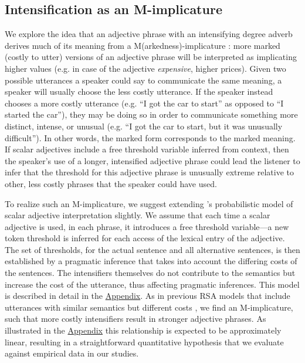 \documentclass[10pt,letterpaper]{article}
\newcommand{\w}[1]{\emph{#1}}
\begin{document}
\subsection{Intensification as an M-implicature}

We explore the idea that an adjective phrase with an intensifying degree adverb derives much of its meaning from a M(arkedness)-implicature \cite{levinson_presumptive_2000}: more marked (costly to utter) versions of an adjective phrase will be interpreted as implicating higher values (e.g. in case of the adjective \w{expensive}, higher prices). 
Given two possible utterances a speaker could say to communicate the same meaning, a speaker will usually choose the less costly utterance.
If the speaker instead chooses a more costly utterance (e.g. ``I got the car to start'' as opposed to ``I started the car''), they may be doing so in order to communicate something more distinct, intense, or unusual (e.g. ``I got the car to start, but it was unusually difficult'').
In other words, the marked form corresponds to the marked meaning.
If scalar adjectives include a free threshold variable inferred from context, then the speaker's use of a longer, intensified adjective phrase could lead the listener to infer that the threshold for this adjective phrase is unusually extreme relative to other, less costly phrases that the speaker could have used. 

To realize such an M-implicature, we suggest extending 's probabilistic model of scalar adjective interpretation slightly.
We assume that each time a scalar adjective is used, in each phrase, it introduces a free threshold variable---a new token threshold is inferred for each access of the lexical entry of the adjective.
The set of thresholds, for the actual sentence and all alternative sentences, is then established by a pragmatic inference that takes into account the differing costs of the sentences.
The intensifiers themselves do not contribute to the semantics but increase the cost of the utterance, thus affecting pragmatic inferences.
This model is described in detail in the \hyperref[app:model]{Appendix}.
As in previous RSA models that include utterances with similar semantics but different costs \cite{bergen_thats_2012, bergen_pragmatic_2014}, we find an M-implicature, such that more costly intensifiers result in stronger adjective phrases.
As illustrated in the \hyperref[app:model]{Appendix} this relationship is expected to be approximately linear, resulting in a straightforward quantitative hypothesis that we evaluate against empirical data in our studies.
\end{document}
